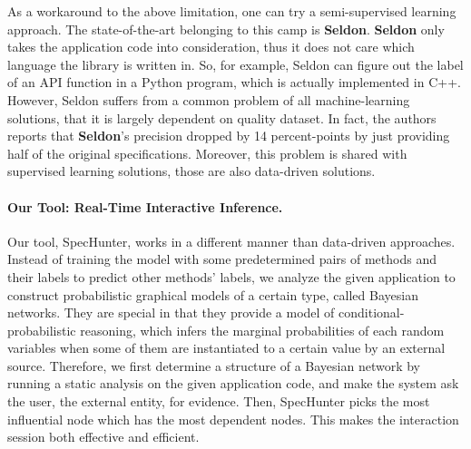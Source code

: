 \documentclass[sigconf,review,anonymous]{acmart}\settopmatter{printfolios=true,printccs=false,printacmref=false}
\begin{document}
As a workaround to the above limitation, one can try a semi-supervised learning
approach. The state-of-the-art belonging to this camp is \textbf{Seldon}.
\textbf{Seldon} only takes the application code into consideration, thus it does
not care which language the library is written in. So, for example, Seldon can
figure out the label of an API function in a Python program, which is
actually implemented in C++. However, Seldon suffers from a common problem of
all machine-learning solutions, that it is largely dependent on quality dataset.
In fact, the authors reports that \textbf{Seldon}'s precision dropped by 14
percent-points by just providing half of the original specifications. Moreover,
this problem is shared with supervised learning solutions, those are also
data-driven solutions.

\paragraph{Our Tool: Real-Time Interactive Inference.}

Our tool, SpecHunter, works in a different manner than data-driven
approaches. Instead of training the model with some predetermined pairs of
methods and their labels to predict other methods' labels, we analyze the given
application to construct probabilistic graphical models of a certain type,
called Bayesian networks. They are special in that they provide a model of
conditional-probabilistic reasoning, which infers the marginal probabilities of
each random variables when some of them are instantiated to a certain value by
an external source. Therefore, we first determine a structure of a Bayesian network
by running a static analysis on the given application code, and make the system ask
the user, the external entity, for evidence. Then, SpecHunter picks the most
influential node which has the most dependent nodes. This makes the interaction
session both effective and efficient.
\end{document}
